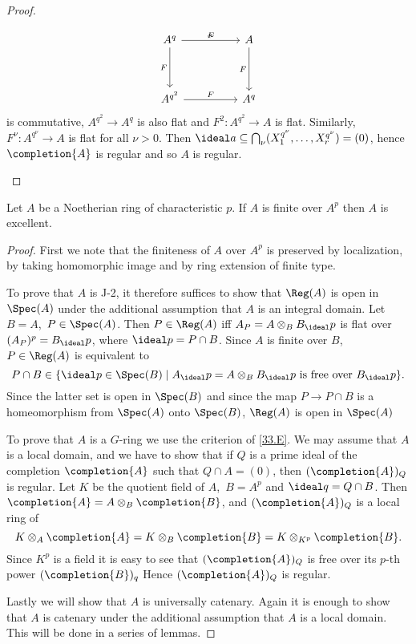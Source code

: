 \documentclass[../main]{subfiles}
\begin{document}
\begin{proof}
\begin{implyenumerate}
    \[\begin{tikzcd}
    	{A^q} && A \\
    	\\
    	{A^{q^2}} && {A^q}
    	\arrow["F", "\sim", from=1-1, to=1-3]
    	\arrow["F", from=3-1, to=3-3]
    	\arrow["F"', from=1-1, to=3-1]
    	\arrow["F"', from=1-3, to=3-3]
    \end{tikzcd}\]
    is commutative, $A^{q^2}\longrightarrow A^q$ is also flat and $F^2: A^{q^2}\longrightarrow A$ is flat. Similarly, $F^{\nu}: A^{q^\nu}\longrightarrow A$ is flat for all $\nu>0$. Then $\ideal a \subseteq \bigcap_\nu(X_1^{q^\nu}, \ldots, X_r^{q^\nu})=(0)$, hence $\completion{A}$ is regular and so $A$ is regular.
\end{implyenumerate}

\end{proof}

\begin{theorem}[E. Kunz]\label{thm:108}
Let $A$ be a Noetherian ring of characteristic $p$. If $A$ is finite over $A^p$ then $A$ is excellent.
\end{theorem}

\begin{proof}
First we note that the finiteness of $A$ over $A^p$ is preserved by localization, by taking homomorphic image and by ring extension of finite type.

To prove that $A$ is J-2, it therefore suffices to show that $\Reg(A)$ is open in $\Spec(A)$ under the additional assumption that $A$ is an integral domain. Let $B=A$, $\, P \in \Spec(A)$. Then $P \in \Reg(A)$ iff $A_P=A \otimes_B B_\ideal p$ is flat over \newline $(A_P)^p=B_\ideal p$, where $\ideal p=P \cap B$. Since $A$ is finite over $B$, $P \in \Reg(A)$ is equivalent to \[P \cap B \in\{\ideal p \in \Spec(B) \mid A_\ideal p=A \otimes_BB_\ideal p\text{ is free over }B_\ideal p\}.\] Since the latter set is open in $\Spec(B)$ and since the map $P\longrightarrow P \cap B$ is a homeomorphism from $\Spec(A)$ onto $\Spec(B)$, $\Reg(A)$ is open in $\Spec(A)$

To prove that $A$ is a $G$-ring we use the criterion of \ref{33.E}. We may assume that $A$ is a local domain, and we have to show that if $Q$ is a prime ideal of the completion $\completion{A}$ such that $Q \cap A=(0)$, then $(\completion{A})_Q$ is regular. Let $K$ be the quotient field of $A$, $\, B=A^p$ and $\ideal q=Q \cap B$. Then $\completion{A}=A \otimes_B \completion{B}$, and $(\completion{A})_Q$ is a local ring of \[K \otimes_A \completion{A}=K \otimes_B \completion{B}=K \otimes_{K^p}\completion{B}.\] Since $K^p$ is a field it is easy to see that $(\completion{A})_Q$ is free over its $p$-th power $(\completion{B})_q$ Hence $(\completion{A})_Q$ is regular.

Lastly we will show that $A$ is universally catenary. Again it is enough to show that $A$ is catenary under the additional assumption that $A$ is a local domain. This will be done in a series of lemmas.
\end{proof}
\end{document}
